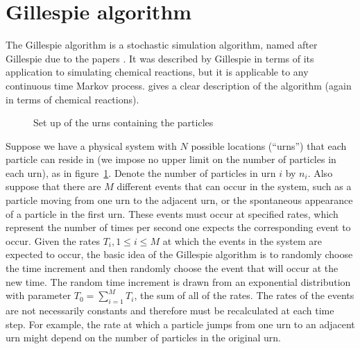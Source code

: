 \documentclass[a4paper,11pt]{article}
\title{}
\author{Matthew Russell}
\date{}
\numberwithin{equation}{section}
\begin{document}
\maketitle

\section{Gillespie algorithm}
The Gillespie algorithm is a stochastic simulation algorithm, named after
Gillespie due to the papers \cite{gillespie1976general,gillespie1977exact}. It
was described by Gillespie in terms of its application to simulating chemical
reactions, but it is applicable to any continuous time Markov process.
\cite{anderson2007modified} gives a clear description of the algorithm (again in
terms of chemical reactions).

\begin{figure}[ht!]
    \centering
    {
    }
    \caption{\label{fig:urns}Set up of the urns containing the particles}
\end{figure}

Suppose we have a physical system with \(N\) possible locations (``urns'') that
each particle can reside in (we impose no upper limit on the number of particles
in each urn), as in figure~\ref{fig:urns}. Denote the number of particles in urn
\(i\) by \(n_i\). Also suppose that there are \(M\)
different events that can occur in the system, such as a particle moving from
one urn to the adjacent urn, or the spontaneous appearance of a particle in the
first urn. These events must occur at specified rates, which represent the
number of times per second one expects the corresponding event to occur.  Given
the rates \(T_i, 1 \le i \le M\) at which the events in the system are expected
to occur, the basic idea of the Gillespie algorithm is to randomly choose the
time increment and then randomly choose the event that will occur at the new
time. The random time increment is drawn from an exponential distribution with
parameter \(T_0 = \sum_{i=1}^M T_i\), the sum of all of the rates. The rates of
the events are not necessarily constants and therefore must be recalculated at
each time step. For example, the rate at which a particle jumps from one urn to
an adjacent urn might depend on the number of particles in the original urn.
\end{document}
